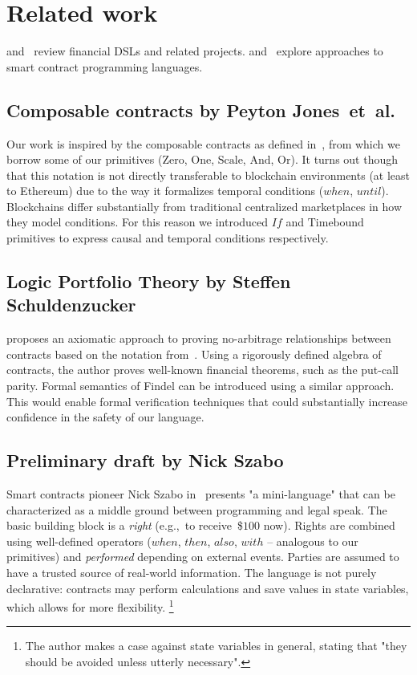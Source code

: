 
\section{Related work}

\cite{Schiller2013} and~\cite{Hvitved2010} review financial DSLs and related projects.
\cite{Seijas2016} and~\cite{Clack2016} explore approaches to smart contract programming languages.

\subsection{Composable contracts by Peyton Jones~et~al.}

Our work is inspired by the composable contracts as defined in~\cite{Jones2003}, from which we borrow some of our primitives (\(\mathrm{Zero}\), \(\mathrm{One}\), \(\mathrm{Scale}\), \(\mathrm{And}\), \(\mathrm{Or}\)).
It turns out though that this notation is not directly transferable to blockchain environments (at least to Ethereum) due to the way it formalizes temporal conditions (\(when\), \(until\)).
Blockchains differ substantially from traditional centralized marketplaces in how they model conditions.
For this reason we introduced \(If\) and \(\mathrm{Timebound}\) primitives to express causal and temporal conditions respectively.


\subsection{Logic Portfolio Theory by Steffen Schuldenzucker}

\cite{Schuldenzucker2016} proposes an axiomatic approach to proving no-arbitrage relationships between contracts based on the notation from~\cite{Jones2003}.
Using a rigorously defined algebra of contracts, the author proves well-known financial theorems, such as the put-call parity.
Formal semantics of Findel can be introduced using a similar approach.
This would enable formal verification techniques that could substantially increase confidence in the safety of our language.


\subsection{Preliminary draft by Nick Szabo}

Smart contracts pioneer Nick Szabo in~\cite{Szabo2002} presents "a mini-language" that can be characterized as a middle ground between programming and legal speak.
The basic building block is a \textit{right} (e.g.,~to receive~\$$100$ now).
Rights are combined using well-defined operators (\(when\), \(then\), \(also\), \(with\) -- analogous to our primitives) and \textit{performed} depending on external events.
Parties are assumed to have a trusted source of real-world information.
The language is not purely declarative: contracts may perform calculations and save values in state variables, which allows for more flexibility.
\footnote{The author makes a case against state variables in general, stating that "they should be avoided unless utterly necessary".}



